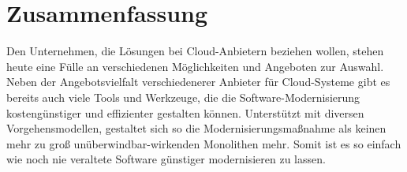 \section{Zusammenfassung}
\label{Zusammenfassung}
 Den Unternehmen, die Lösungen bei Cloud-Anbietern beziehen wollen, stehen heute eine Fülle an verschiedenen Möglichkeiten und Angeboten zur Auswahl. Neben der Angebotsvielfalt verschiedenerer Anbieter für Cloud-Systeme gibt es bereits auch viele Tools und Werkzeuge, die die Software-Modernisierung kostengünstiger und effizienter gestalten können. Unterstützt mit diversen Vorgehensmodellen, gestaltet sich so die Modernisierungsmaßnahme als keinen mehr zu groß unüberwindbar-wirkenden Monolithen mehr. Somit ist es so einfach wie noch nie veraltete Software günstiger modernisieren zu lassen.